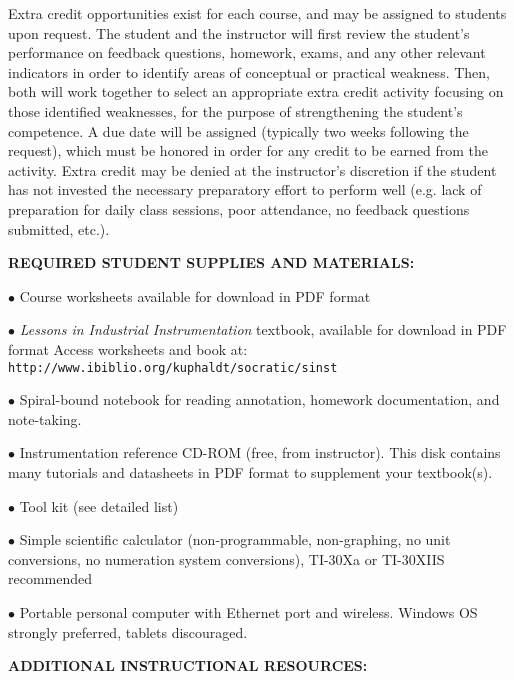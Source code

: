 Extra credit opportunities exist for each course, and may be assigned to students upon request.  The student and the instructor will first review the student's performance on feedback questions, homework, exams, and any other relevant indicators in order to identify areas of conceptual or practical weakness.  Then, both will work together to select an appropriate extra credit activity focusing on those identified weaknesses, for the purpose of strengthening the student's competence.  A due date will be assigned (typically two weeks following the request), which must be honored in order for any credit to be earned from the activity.  Extra credit may be denied at the instructor's discretion if the student has not invested the necessary preparatory effort to perform well (e.g. lack of preparation for daily class sessions, poor attendance, no feedback questions submitted, etc.).


\vfil \eject

\noindent
{\bf REQUIRED STUDENT SUPPLIES AND MATERIALS:} 

\item{$\bullet$} Course worksheets available for download in PDF format
\item{$\bullet$} {\it Lessons in Industrial Instrumentation} textbook, available for download in PDF format
\itemitem{$\rightarrow$} Access worksheets and book at: {\tt http://www.ibiblio.org/kuphaldt/socratic/sinst}
\item{$\bullet$} Spiral-bound notebook for reading annotation, homework documentation, and note-taking.
\item{$\bullet$} Instrumentation reference CD-ROM (free, from instructor).  This disk contains many tutorials and datasheets in PDF format to supplement your textbook(s).
\item{$\bullet$} Tool kit (see detailed list)
\item{$\bullet$} Simple scientific calculator (non-programmable, non-graphing, no unit conversions, no numeration system conversions), TI-30Xa or TI-30XIIS recommended
\item{$\bullet$} Portable personal computer with Ethernet port and wireless.  Windows OS strongly preferred, tablets discouraged.

\vskip 10pt

\noindent
{\bf ADDITIONAL INSTRUCTIONAL RESOURCES:} 

